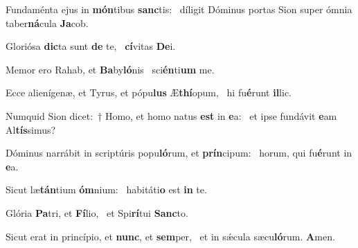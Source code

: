 \item Fundaménta ejus in \textbf{món}tibus \textbf{sanc}tis:~\psstar{} díligit Dóminus portas Sion super ómnia taber\textbf{ná}cula \textbf{Ja}cob.

\item Gloriósa \textbf{dic}ta sunt \textbf{de} te,~\psstar{} \textbf{cí}vitas \textbf{De}i.

\item Memor ero Rahab, et \textbf{Ba}by\textbf{ló}nis~\psstar{} sci\textbf{én}ti\textbf{um} me.

\item Ecce alienígenæ, et Tyrus, et pópu\textbf{lus} Æ\textbf{thí}opum,~\psstar{} hi fu\textbf{é}runt \textbf{il}lic.

\item Numquid Sion dicet:~† Homo, et homo natus \textbf{est} in \textbf{e}a:~\psstar{} et ipse fundávit \textbf{e}am Al\textbf{tís}simus?

\item Dóminus narrábit in scriptúris popu\textbf{ló}rum, et \textbf{prín}cipum:~\psstar{} horum, qui fu\textbf{é}runt in \textbf{e}a.

\item Sicut læ\textbf{tán}tium \textbf{óm}nium:~\psstar{} habitáti\textbf{o} est \textbf{in} te.

\item Glória \textbf{Pa}tri, et \textbf{Fí}lio,~\psstar{} et Spi\textbf{rí}tui \textbf{Sanc}to.

\item Sicut erat in princípio, et \textbf{nunc}, et \textbf{sem}per,~\psstar{} et in sǽcula sæcu\textbf{ló}rum. \textbf{A}men.
